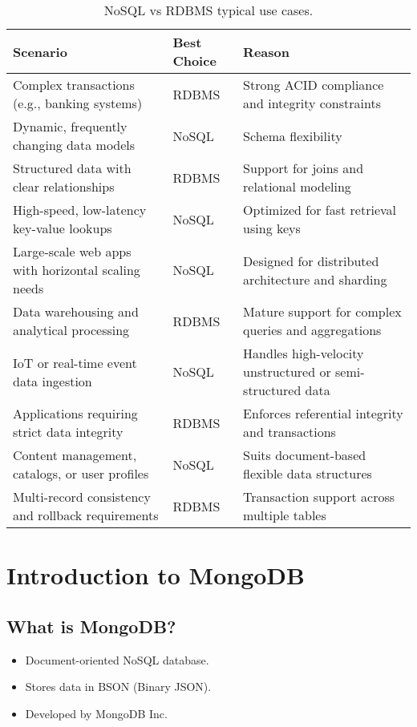\documentclass{article}
\begin{document}
    \begin{table}
        \centering
        \begin{tabular}{@{}p{6cm}p{2.5cm}p{6.5cm}@{}}
            \toprule
            \textbf{Scenario} & \textbf{Best Choice} & \textbf{Reason} \\
            \midrule
            Complex transactions (e.g., banking systems) & RDBMS & Strong ACID compliance and integrity constraints \\
            Dynamic, frequently changing data models & NoSQL & Schema flexibility \\
            Structured data with clear relationships & RDBMS & Support for joins and relational modeling \\
            High-speed, low-latency key-value lookups & NoSQL & Optimized for fast retrieval using keys \\
            Large-scale web apps with horizontal scaling needs & NoSQL & Designed for distributed architecture and sharding \\
            Data warehousing and analytical processing & RDBMS & Mature support for complex queries and aggregations \\
            IoT or real-time event data ingestion & NoSQL & Handles high-velocity unstructured or semi-structured data \\
            Applications requiring strict data integrity & RDBMS & Enforces referential integrity and transactions \\
            Content management, catalogs, or user profiles & NoSQL & Suits document-based flexible data structures \\
            Multi-record consistency and rollback requirements & RDBMS & Transaction support across multiple tables \\
            \bottomrule
        \end{tabular}
        \caption{NoSQL vs RDBMS typical use cases.}
        \label{tab:use_cases}
    \end{table}

\section{Introduction to MongoDB}

\subsection{What is MongoDB?}
\begin{itemize}
    \item Document-oriented NoSQL database.
    \item Stores data in BSON (Binary JSON).
    \item Developed by MongoDB Inc.
\end{itemize}
\end{document}
